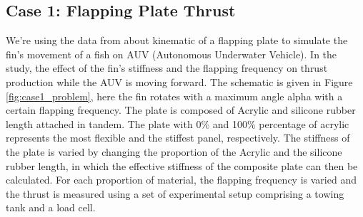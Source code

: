 \documentclass[conf]{new-aiaa}
\begin{document}
\subsection{Case 1: Flapping Plate Thrust}
We're using the data from \cite{luqman2022thrust} about kinematic of a flapping plate to simulate the fin's movement of a fish on AUV (Autonomous Underwater Vehicle). In the study, the effect of the fin's stiffness and the flapping frequency on thrust production while the AUV is moving forward. The schematic is given in Figure \ref{fig:case1_problem}, here the fin rotates with a maximum angle alpha with a certain flapping frequency. The plate is composed of Acrylic and silicone rubber length attached in tandem. The plate with 0\% and 100\% percentage of acrylic represents the most flexible and the stiffest panel, respectively. The stiffness of the plate is varied by changing the proportion of the Acrylic and the silicone rubber length, in which the effective stiffness of the composite plate can then be calculated. For each proportion of material, the flapping frequency is varied and the thrust is measured using a set of experimental setup comprising a towing tank and a load cell.
\end{document}
